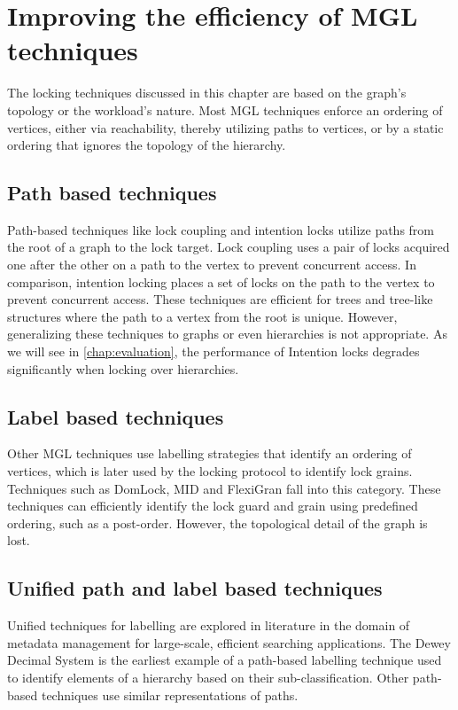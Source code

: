 \section{Improving the efficiency of MGL techniques}

The locking techniques discussed in this chapter are based on the graph's topology or the workload's nature. Most MGL techniques enforce an ordering of vertices, either via reachability, thereby utilizing paths to vertices, or by a static ordering that ignores the topology of the hierarchy.

\subsection{Path based techniques}
Path-based techniques like lock coupling \cite{DBLP:journals/acta/BayerS77}  and intention locks \cite{gray1975granularity} utilize paths from the root of a graph to the lock target. Lock coupling uses a pair of locks acquired one after the other on a path to the vertex to prevent concurrent access. In comparison, intention locking places a set of locks on the path to the vertex to prevent concurrent access. These techniques are efficient for trees and tree-like structures where the path to a vertex from the root is unique. However, generalizing these techniques to graphs or even hierarchies is not appropriate. As we will see in \cref{chap:evaluation}, the performance of Intention locks degrades significantly when locking over hierarchies.

\subsection{Label based techniques}
Other MGL techniques use labelling strategies that identify an ordering of vertices, which is later used by the locking protocol to identify lock grains. Techniques such as DomLock, MID and FlexiGran fall into this category. These techniques can efficiently identify the lock guard and grain using predefined ordering, such as a post-order. However, the topological detail of the graph is lost.  


\subsection{Unified path and label based techniques}
Unified techniques for labelling are explored in literature in the domain of metadata management for large-scale, efficient searching applications. The Dewey Decimal System \cite{DBLP:journals/jd/Sweeney83} is the earliest example of a path-based labelling technique used to identify elements of a hierarchy based on their sub-classification. Other path-based techniques use similar representations of paths. 

